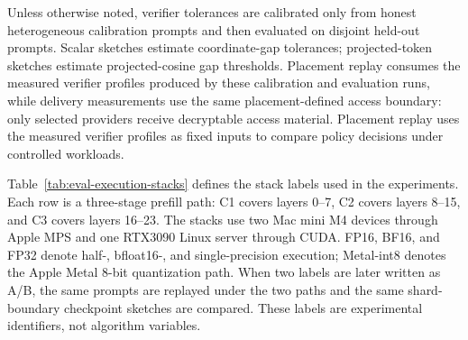 \documentclass[sigplan,screen,review,anonymous]{acmart}
\begin{document}
Unless otherwise noted, verifier tolerances are calibrated only from honest
heterogeneous calibration prompts and then evaluated on disjoint held-out
prompts. Scalar sketches estimate coordinate-gap tolerances; projected-token
sketches estimate projected-cosine gap thresholds. Placement replay consumes
the measured verifier profiles produced by these calibration and evaluation
runs, while delivery measurements use the same placement-defined access
boundary: only selected providers receive decryptable access material.
Placement replay uses the measured verifier profiles as fixed
inputs to compare policy decisions under controlled workloads.

Table~\ref{tab:eval-execution-stacks} defines the stack labels used in the
experiments. Each row is a three-stage prefill path: C1 covers layers 0--7, C2
covers layers 8--15, and C3 covers layers 16--23. The stacks use two Mac mini
M4 devices through Apple MPS and one RTX3090 Linux server through CUDA. FP16,
BF16, and FP32 denote half-, bfloat16-, and single-precision execution;
Metal-int8 denotes the Apple Metal 8-bit quantization path. When two labels are
later written as A/B, the same prompts are replayed under the two paths and the
same shard-boundary checkpoint sketches are compared.
These labels are experimental identifiers, not algorithm variables.
\end{document}
